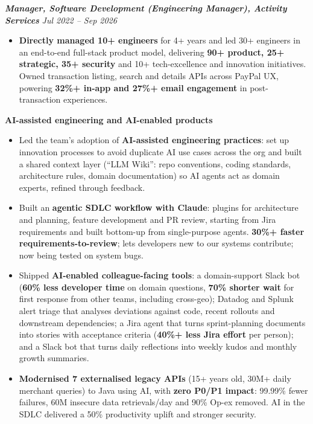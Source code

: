 \documentclass[10pt,a4paper]{article}
\newcommand{\bd}[1]{\textbf{#1}}
\newcommand{\role}[2]{%
  \par\vspace{5pt}\noindent\textcolor{rolecolor}{\textbf{\textit{#1}}}\hfill
  \textcolor{rolecolor}{\textit{#2}}\par\nopagebreak}
\newcommand{\subhead}[1]{%
  \par\vspace{4pt}\noindent\textcolor{rolecolor}{\textbf{#1}}\par\nopagebreak\vspace{0.5pt}}
\begin{document}
\role{Manager, Software Development (Engineering Manager), Activity Services}{Jul 2022 -- Sep 2026}
\begin{itemize}
\item \bd{Directly managed 10+ engineers} for 4+ years and led 30+ engineers in an end-to-end
  full-stack product model, delivering \bd{90+ product, 25+ strategic, 35+ security} and 10+
  tech-excellence and innovation initiatives. Owned transaction listing, search and details APIs
  across PayPal UX, powering \bd{32\%+ in-app and 27\%+ email engagement} in post-transaction
  experiences.
\end{itemize}

\subhead{AI-assisted engineering and AI-enabled products}
\begin{itemize}
\item Led the team's adoption of \bd{AI-assisted engineering practices}: set up innovation processes to avoid
  duplicate AI use cases across the org and built a shared context layer (``LLM Wiki'': repo
  conventions, coding standards, architecture rules, domain documentation) so AI agents act as
  domain experts, refined through feedback.
\item Built an \bd{agentic SDLC workflow with Claude}: plugins for architecture and planning,
  feature development and PR review, starting from Jira requirements and built bottom-up from
  single-purpose agents. \bd{30\%+ faster requirements-to-review}; lets developers new to our
  systems contribute; now being tested on system bugs.
\item Shipped \bd{AI-enabled colleague-facing tools}: a domain-support Slack bot (\bd{60\% less
  developer time} on domain questions, \bd{70\% shorter wait} for first response from other
  teams, including cross-geo); Datadog and Splunk alert triage that analyses deviations against
  code, recent rollouts and downstream dependencies; a Jira agent that turns sprint-planning
  documents into stories with acceptance criteria (\bd{40\%+ less Jira effort} per person); and
  a Slack bot that turns daily reflections into weekly kudos and monthly growth summaries.
\item \bd{Modernised 7 externalised legacy APIs} (15+ years old, 30M+ daily merchant queries) to
  Java using AI, with \bd{zero P0/P1 impact}: 99.99\% fewer failures, 60M insecure data
  retrievals/day and 90\% Op-ex removed. AI in the SDLC delivered a 50\% productivity uplift and
  stronger security.
\end{itemize}
\end{document}
